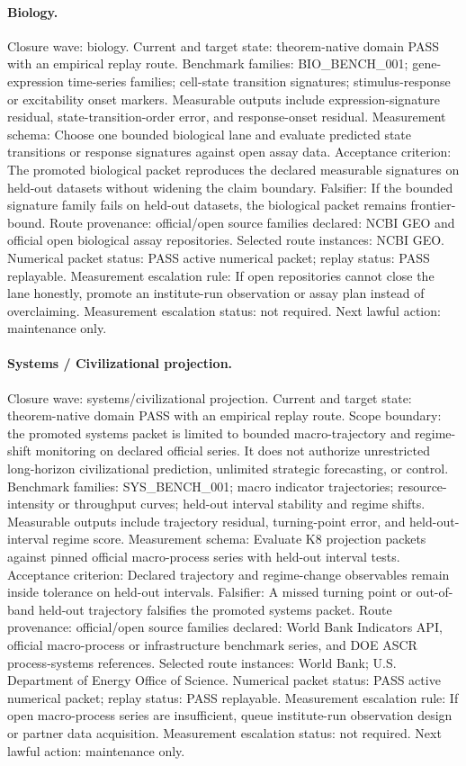 \paragraph{Biology.}
Closure wave: biology. Current and target state: theorem-native domain PASS with an empirical replay route.
Benchmark families: BIO\_BENCH\_001; gene-expression time-series families; cell-state transition signatures; stimulus-response or excitability onset markers.
Measurable outputs include expression-signature residual,
state-transition-order error, and response-onset residual.
Measurement schema: Choose one bounded biological lane and evaluate predicted state transitions or response signatures against open assay data.
Acceptance criterion: The promoted biological packet reproduces the declared measurable signatures on held-out datasets without widening the claim boundary.
Falsifier: If the bounded signature family fails on held-out datasets, the biological packet remains frontier-bound.
Route provenance: official/open source families declared: NCBI GEO and official open biological assay repositories.
Selected route instances: NCBI GEO.
Numerical packet status: PASS active numerical packet; replay status: PASS replayable.
Measurement escalation rule: If open repositories cannot close the lane honestly, promote an institute-run observation or assay plan instead of overclaiming.
Measurement escalation status: not required.
Next lawful action: maintenance only.

\paragraph{Systems / Civilizational projection.}
Closure wave: systems/civilizational projection. Current and target state: theorem-native domain PASS with an empirical replay route.
Scope boundary: the promoted systems packet is limited to bounded macro-trajectory and regime-shift monitoring on declared official series. It does not authorize unrestricted long-horizon civilizational prediction, unlimited strategic forecasting, or control.
Benchmark families: SYS\_BENCH\_001; macro indicator trajectories; resource-intensity or throughput curves; held-out interval stability and regime shifts.
Measurable outputs include trajectory residual, turning-point error, and
held-out-interval regime score.
Measurement schema: Evaluate K8 projection packets against pinned official macro-process series with held-out interval tests.
Acceptance criterion: Declared trajectory and regime-change observables remain inside tolerance on held-out intervals.
Falsifier: A missed turning point or out-of-band held-out trajectory falsifies the promoted systems packet.
Route provenance: official/open source families declared: World Bank Indicators API, official macro-process or infrastructure benchmark series, and DOE ASCR process-systems references.
Selected route instances: World Bank; U.S. Department of Energy Office of Science.
Numerical packet status: PASS active numerical packet; replay status: PASS replayable.
Measurement escalation rule: If open macro-process series are insufficient, queue institute-run observation design or partner data acquisition.
Measurement escalation status: not required.
Next lawful action: maintenance only.

